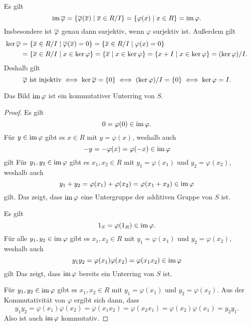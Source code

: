 \subsection{}

Es gilt
\[
    \operatorname{im} \overline{\varphi}
  = \{ \overline{\varphi}(\overline{x}) \mid \overline{x} \in R/I \}
  = \{ \varphi(x) \mid x \in R \}
  = \operatorname{im} \varphi.
\]
Insbesondere ist $\overline{\varphi}$ genau dann surjektiv, wenn $\varphi$ surjektiv ist.
Außerdem gilt
\begin{align*}
      \ker \overline{\varphi}
  &=  \{ \overline{x} \in R/I \mid \overline{\varphi}( \overline{x} ) = 0 \}
   =  \{ \overline{x} \in R/I \mid \varphi(x) = 0 \}
  \\
  &=  \{ \overline{x} \in R/I \mid x \in \ker \varphi \}
   =  \{ \overline{x} \mid x \in \ker \varphi \}
   =  \{ x + I \mid x \in \ker \varphi \}
   =  (\ker \varphi)/I.
\end{align*}
Deshalb gilt
\[
        \text{$\overline{\varphi}$ ist injektiv}
  \iff  \ker \overline{\varphi} = \{0\}
  \iff  (\ker \varphi)/I = \{0\}
  \iff  \ker \varphi = I.
\]

\begin{claim}
  Das Bild $\operatorname{im} \varphi$ ist ein kommutativer Unterring von $S$.
\end{claim}
\begin{proof}
  Es gilt
  \[
        0
    =   \varphi(0)
    \in \operatorname{im} \varphi.
  \]
  Für $y \in \operatorname{im} \varphi$ gibt es $x \in R$ mit $y = \varphi(x)$, weshalb auch
  \[
        -y
    =   -\varphi(x)
    =   \varphi(-x)
    \in \operatorname{im} \varphi
  \]
  gilt
  Für $y_1, y_2 \in \operatorname{im} \varphi$ gibt es $x_1, x_2 \in R$ mit $y_1 = \varphi(x_1)$ und $y_2 = \varphi(x_2)$, weshalb auch
  \[
        y_1 + y_2
    =   \varphi(x_1) + \varphi(x_2)
    =   \varphi(x_1 + x_2)
    \in \operatorname{im} \varphi
  \]
  gilt.
  Das zeigt, dass $\operatorname{im} \varphi$ eine Untergruppe der additiven Gruppe von $S$ ist.

  Es gilt
  \[
    1_S = \varphi(1_R) \in \operatorname{im} \varphi.
  \]
  Für alle $y_1, y_2 \in \operatorname{im} \varphi$ gibt es $x_1, x_2 \in R$ mit $y_1 = \varphi(x_1)$ und $y_2 = \varphi(x_2)$, weshalb auch
  \[
        y_1 y_2
    =   \varphi(x_1) \varphi(x_2)
    =   \varphi(x_1 x_2)
    \in \operatorname{im} \varphi
  \]
  gilt
  Das zeigt, dass $\operatorname{im} \varphi$ bereits ein Unterring von $S$ ist.
  
  Für $y_1, y_2 \in \operatorname{im} \varphi$ gibt es $x_1, x_2 \in R$ mit $y_1 = \varphi(x_1)$ und $y_2 = \varphi(x_2)$.
  Aus der Kommutativität von $\varphi$ ergibt sich dann, dass
  \[
      y_1 y_2
    = \varphi(x_1) \varphi(x_2)
    = \varphi(x_1 x_2)
    = \varphi(x_2 x_1)
    = \varphi(x_2) \varphi(x_1)
    = y_2 y_1.
  \]
  Also ist auch $\operatorname{im} \varphi$ kommutativ.
\end{proof}

